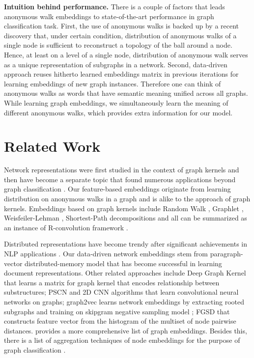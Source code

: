 \documentclass{article}
\theoremstyle{definition}
\begin{document}
\textbf{Intuition behind performance.} 
There is a couple of factors that leads anonymous walk embeddings to state-of-the-art performance in graph classification task. First, the use of anonymous walks is backed up by a recent discovery that, under certain condition, distribution of anonymous walks of a single node is sufficient to reconstruct a topology of the ball around a node. Hence, at least on a level of a single node, distribution of anonymous walk serves as a unique representation of subgraphs in a network. Second, data-driven approach reuses hitherto learned embeddings matrix  in previous iterations for learning embeddings of new graph instances. Therefore one can think of anonymous walks as words that have semantic meaning unified across all graphs. While learning graph embeddings, we simultaneously learn the meaning of different anonymous walks, which provides extra information for our model. 





\section{Related Work}
Network representations were first studied in the context of graph kernels \cite{gartner:hardness} and then have become a separate topic that found numerous applications beyond graph classification \cite{survey:embeddings}. Our feature-based embeddings originate from learning distribution on anonymous walks in a graph and is alike to the approach of graph kernels. Embeddings based on graph kernels include Random Walk \cite{gartner:hardness}, Graphlet \cite{graphlet:09}, Weisfeiler-Lehman \cite{wlkernel:11}, Shortest-Path \cite{shortest} decompositions and all can be summarized as an instance of R-convolution framework \cite{rconvolution}. 

Distributed representations have become trendy after significant achievements in NLP applications \cite{word2vec,negativesampling}. Our data-driven network embeddings stem from paragraph-vector distributed-memory model \cite{doc2vec} that has become successful in learning document representations. Other related approaches include Deep Graph Kernel \cite{deepgraph} that learns a matrix for graph kernel that encodes relationship between substructures; PSCN \cite{learncnn:16} and 2D CNN \cite{2dcnn} algorithms that learn convolutional neural networks on graphs; graph2vec \cite{graph2vec:algo} learns network embeddings by extracting rooted subgraphs and training on skipgram negative sampling model \cite{negativesampling}; FGSD \cite{FGSD} that constructs feature vector from the histogram of the multiset of node pairwise distances. \cite{survey:embeddings} provides a more comprehensive list of graph embeddings. Besides this, there is a list of aggregation techniques of node embeddings for the purpose of graph classification \cite{leskovec:representation}.
\end{document}

